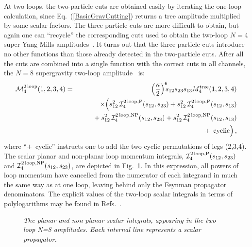 At two loops, the two-particle cuts are obtained easily by
iterating the one-loop calculation, since Eq.~(\ref{BasicGravCutting})
returns a tree amplitude multiplied by some scalar factors. The
three-particle cuts are more difficult to obtain, but again one can
``recycle'' the corresponding cuts used to obtain the two-loop $N=4$
super-Yang-Mills amplitudes~\cite{BRY}.  It turns out that the
three-particle cuts introduce no other functions than those already
detected in the two-particle cuts.  After all the cuts are combined into a
single function with the correct cuts in all channels, the $N=8$
supergravity two-loop amplitude~\cite{BDDPR} is:
%
\begin{eqnarray}
{\cal M}_4^{{\rm 2\,loop}}(1,2,3,4) & = &
  \Bigl({\kappa \over 2} \Bigr)^6 \!\! s_{12} s_{23} s_{13}
  M_4^{\rm tree}(1,2,3,4) \nonumber\\
&& \hskip .3 cm \times
\Bigl( s_{12}^2 \, {\cal I}_4^{{\rm 2\, loop},{\rm P}}(s_{12},s_{23}) 
+ s_{12}^2 \, {\cal I}_4^{{\rm 2\, loop},{\rm P}}(s_{12},s_{13}) \nonumber \\
& & \null \hskip  .7 cm  
+ s_{12}^2 \, {\cal I}_4^{{\rm 2\, loop},{\rm NP}}(s_{12},s_{23})
+ s_{12}^2 \, {\cal I}_4^{{\rm 2\, loop},{\rm NP}}(s_{12},s_{13}) \nonumber \\
& & \null \hskip  3 cm  
+\;  \hbox{cyclic} \Bigr) \,, 
\label{TwoLoopAmplitude}
\end{eqnarray}
%
where ``$+$~cyclic'' instructs one to add the two cyclic permutations of
legs (2,3,4). The scalar planar and non-planar loop momentum integrals, ${\cal
I}_4^{{\rm 2\,loop},{\rm P}}(s_{12}, s_{23})$ 
and ${\cal I}_4^{{\rm 2\,loop},{\rm
NP}}(s_{12}, s_{23})$, are depicted in 
Fig.~\ref{figure:PlanarNonPlanar}.  In this
expression, all powers of loop momentum have cancelled from the
numerator of each integrand in much the same way as at one loop,
leaving behind only the Feynman propagator denominators.  The explicit
values of the two-loop scalar integrals in terms of polylogarithms may
be found in Refs.~\cite{Smirnov99,Tausk99}.

\begin{figure}[h]
  \def\epsfsize#1#2{0.5#1}
  \centerline{}
  \caption{\it The planar and non-planar scalar integrals, 
   appearing in the two-loop N=8 amplitudes.
   Each internal line represents a scalar propagator.}
  \label{figure:PlanarNonPlanar}
\end{figure}

